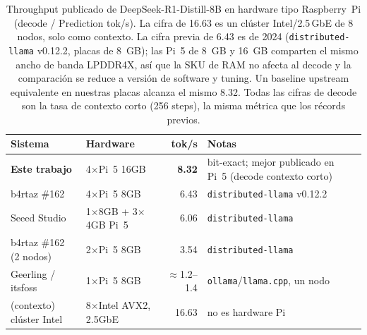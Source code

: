 \documentclass[10pt,a4paper]{article}
\begin{document}
\begin{table}[H]
\centering\small\setlength{\tabcolsep}{4pt}
\caption{Throughput publicado de DeepSeek-R1-Distill-8B en hardware tipo Raspberry~Pi (decode / Prediction tok/s). La cifra de 16.63 es un clúster Intel/2.5\,GbE de 8 nodos, solo como contexto. La cifra previa de 6.43 es de 2024 (\texttt{distributed-llama} v0.12.2, placas de 8~GB); las Pi~5 de 8~GB y 16~GB comparten el mismo ancho de banda LPDDR4X, así que la SKU de RAM no afecta al decode y la comparación se reduce a versión de software y tuning. Un baseline upstream equivalente en nuestras placas alcanza el mismo 8.32. Todas las cifras de decode son la tasa de contexto corto (256 steps), la misma métrica que los récords previos.}
\label{tab:records}
\begin{tabularx}{\textwidth}{p{4.6cm}p{3.2cm}r X}
\toprule
\textbf{Sistema} & \textbf{Hardware} & \textbf{tok/s} & \textbf{Notas} \\
\midrule
\textbf{Este trabajo} & 4$\times$Pi~5 16GB & \textbf{8.32} & bit-exact; mejor publicado en Pi~5 (decode contexto corto) \\
b4rtaz \#162 \citep{dllama162} & 4$\times$Pi~5 8GB & 6.43 & \texttt{distributed-llama} v0.12.2 \\
Seeed Studio \citep{seeed2025} & 1$\times$8GB + 3$\times$4GB Pi~5 & 6.06 & \texttt{distributed-llama} \\
b4rtaz \#162 (2 nodos) & 2$\times$Pi~5 8GB & 3.54 & \texttt{distributed-llama} \\
Geerling / itsfoss \citep{geerling2025} & 1$\times$Pi~5 8GB & $\approx$1.2--1.4 & \texttt{ollama}/\texttt{llama.cpp}, un nodo \\
\midrule
(contexto) clúster Intel \citep{dllama162} & 8$\times$Intel AVX2, 2.5GbE & 16.63 & no es hardware Pi \\
\bottomrule
\end{tabularx}
\end{table}
\end{document}
